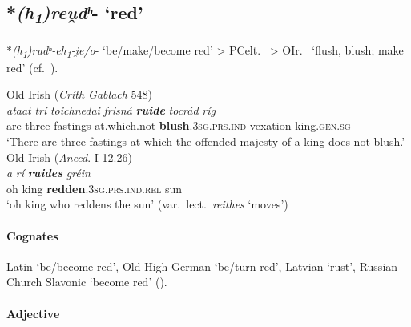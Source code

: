 \documentclass[output=paper,colorlinks,citecolor=brown]{langscibook}
\begin{document}
\subsection{*\textit{(h\textsubscript{1})reu̯dʰ}- ‘red’}
\label{sec:stativered}

*\textit{(h\textsubscript{1})rudʰ-eh\textsubscript{1}-i̯e/o}-   ‘be/make/become red’ > PCelt.\  > OIr.\   ‘flush, blush; make red’ (cf.\ \citealt[552--553]{Schumacher2004}). 


\begin{exe}
    \ex Old Irish (\textit{Críth Gablach} 548) \label{ex:stativered1}\\
        \gll \textit{ataat} \textit{trí} \textit{toichnedai} \textit{frisná} \textit{\textbf{ruide}} \textit{tocrád} \textit{ríg} \\
        are three fastings at.which.not \textbf{blush}.\textsc{3sg}.\textsc{prs.ind} vexation king.\textsc{gen.sg}\\
        \glt ‘There are three fastings at which the offended majesty of a king does not blush.’\\ 

    \ex Old Irish (\textit{Anecd}. I 12.26) \label{ex:stativered2}\\
        \gll \textit{a} \textit{rí} \textit{\textbf{ruides}}  \textit{gréin} \\
        oh king \textbf{redden}.\textsc{3sg}.\textsc{prs.ind.rel} sun\\
        \glt ‘oh king who reddens the sun’ (var.\ lect.\ \textit{reithes} ‘moves’)\\
\end{exe}



\paragraph*{Cognates} 

Latin  ‘be/become red’, Old High German  ‘be/turn red’, Latvian  ‘rust’, Russian Church Slavonic  ‘become red’ ().

\paragraph*{Adjective} 
\end{document}
